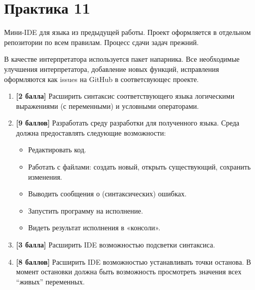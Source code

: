 \section{Практика 11}

Мини-IDE для языка из предыдущей работы. Проект оформляется в отдельном репозитории по всем правилам. Процесс сдачи задач прежний.

В качестве интерпретатора используется пакет напарника. Все необходимые улучшения интерпретатора, добавление новых функций, исправления оформляются как issues на GitHub в соответсвующес проекте.

\begin{enumerate}
    \item \textbf{[2 балла]} Расширить синтаксис соответствующего языка логическими выражениями (с переменными) и условными операторами.
    \item \textbf{[9 баллов]} Разработать среду разработки для полученного языка. Среда должна предоставлять следующие возможности:
    \begin{itemize}
        \item Редактировать код.
        \item Работать с файлами: создать новый, открыть существующий, сохранить изменения. 
        \item Выводить сообщения о (синтаксических) ошибках.
        \item Запустить программу на исполнение.
        \item Видеть результат исполнения в «консоли».
    \end{itemize}
    \item \textbf{[3 балла]} Расширить IDE возможностью подсветки синтаксиса.
    \item \textbf{[8 баллов]} Расширить IDE возможностью устанавливать точки останова. В момент остановки должна быть возможность просмотреть значения всех ``живых'' переменных.
  
\end{enumerate}